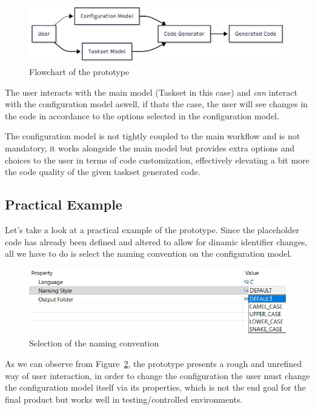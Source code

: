 \begin{figure}[htbp]
	\centering
	\includegraphics[height=0.22\textwidth]{prototype_flowchart.png}
	\caption{Flowchart of the prototype}
	\label{fig:prototype_flowchart}
\end{figure}

The user interacts with the main model (Taskset in this case) and \textit{can} interact with the configuration model aswell, if thats the case, the user will see changes in the code in accordance to the options selected in the configuration model.

The configuration model is not tightly coupled to the main workflow and is not mandatory, it works alongside the main model but provides extra options and choices to the user in terms of code customization, effectively elevating a bit more the code quality of the given taskset generated code.

\subsection{Practical Example}
\label{sec:practical_example}
 
Let's take a look at a practical example of the prototype. Since the placeholder code has already been defined and altered to allow for dinamic identifier changes, all we have to do is select the naming convention on the configuration model.

\begin{figure}[htbp]
	\centering
	\includegraphics[height=0.22\textwidth]{naming_convention_selection.png}
	\caption{Selection of the naming convention}
	\label{fig:prototype_selection}
\end{figure}

As we can observe from Figure~\ref{fig:prototype_selection}, the prototype presents a rough and unrefined way of user interaction, in order to change the configuration the user must change the configuration model itself via its properties, which is not the end goal for the final product but works well in testing/controlled environments. 

